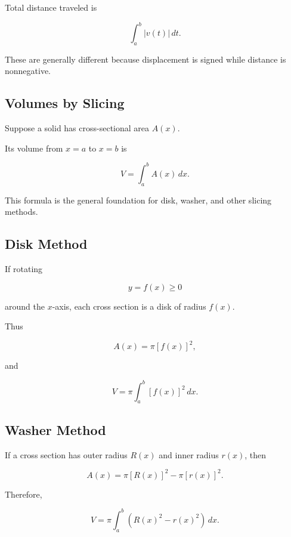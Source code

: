 Total distance traveled is

\[ \int_a^b|v(t)|\,dt. \]

These are generally different because displacement is signed while distance
is nonnegative.

\subsection{Volumes by Slicing}
\label{subsec:volumes-slicing}

Suppose a solid has cross-sectional area \(A(x)\).

Its volume from \(x=a\) to \(x=b\) is

\[ V=\int_a^b A(x)\,dx. \]

This formula is the general foundation for disk, washer, and other slicing
methods.

\subsection{Disk Method}
\label{subsec:disk-method}

If rotating

\[ y=f(x)\geq0 \]

around the \(x\)-axis, each cross section is a disk of radius \(f(x)\).

Thus

\[ A(x)=\pi[f(x)]^2, \]

and

\[ \boxed{V=\pi\int_a^b[f(x)]^2\,dx.} \]

\subsection{Washer Method}
\label{subsec:washer-method}

If a cross section has outer radius \(R(x)\) and inner radius \(r(x)\), then

\[ A(x)=\pi[R(x)]^2-\pi[r(x)]^2. \]

Therefore,

\[ \boxed{
V=\pi\int_a^b
\left(R(x)^2-r(x)^2\right)\,dx.
} \]

